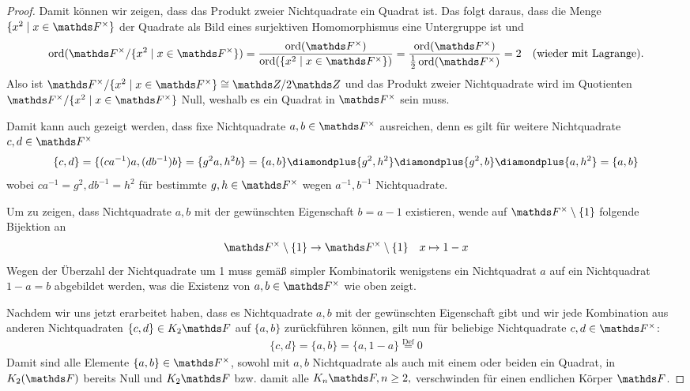 \documentclass[ngerman,fontsize=11pt, paper=a4, parskip=half, titlepage=true, toc=bib]{scrartcl}
\begin{document}
\begin{Lem}
\begin{proof}
    Damit können wir zeigen, dass das Produkt zweier Nichtquadrate ein
    Quadrat ist. Das folgt daraus, dass  die Menge 
    $\{x^2\mid x\in\Fx\}$ der Quadrate 
    als Bild eines surjektiven Homomorphismus eine Untergruppe ist und 
    \begin{gather*}
      \Ord(\Fx/\{x^2\mid x\in\Fx\})
      =\frac{\Ord(\Fx)}{\Ord(\{x^2\mid x\in\Fx\})}
      =\frac{\Ord(\Fx)}{\frac{1}{2}\Ord(\Fx)}=2
      \quad\text{(wieder mit Lagrange).}
    \end{gather*} 
    Also ist $\Fx/\{x^2\mid x\in\Fx\}\cong \Z/2\Z$ und das Produkt 
    zweier Nichtquadrate wird im Quotienten
    $\Fx/\{x^2\mid x\in\Fx\}$ Null, weshalb es ein Quadrat in $\Fx$
    sein muss.

    Damit kann auch gezeigt werden, dass fixe Nichtquadrate $a,b\in\Fx$
    ausreichen, denn es gilt für weitere Nichtquadrate $c,d\in\Fx$
    \begin{gather*}
      \{c,d\}=\{(ca^{-1})a,(db^{-1})b\}=\{g^2a,h^2b\}
      =\{a,b\}\p\{g^2,h^2\}\p\{g^2,b\}\p\{a,h^2\}
      =\{a,b\}
    \end{gather*}
    wobei $ca^{-1}=g^2,db^{-1}=h^2$ für bestimmte $g,h\in\Fx$
    wegen $a^{-1},b^{-1}$ Nichtquadrate.

    Um zu zeigen, dass Nichtquadrate $a,b$ mit der gewünschten
    Eigenschaft $b=a-1$ existieren, wende auf $\Fx\setminus\{1\}$ 
    folgende Bijektion an
    \begin{align*}
      \Fx\setminus\{1\}&\to \Fx\setminus\{1\}
      &x\mapsto 1-x
    \end{align*}
    Wegen der Überzahl der Nichtquadrate um 1 muss gemäß simpler
    Kombinatorik wenigstens ein Nichtquadrat $a$  auf ein Nichtquadrat
    $1-a=b$ abgebildet werden, was die Existenz
    von $a,b\in\Fx$ wie oben zeigt.

    Nachdem wir uns jetzt erarbeitet haben, dass es Nichtquadrate
    $a,b$ mit der gewünschten Eigenschaft gibt und wir jede
    Kombination aus anderen Nichtquadraten $\{c,d\}\in\K_2\F$ 
    auf $\{a,b\}$ zurückführen können,
    gilt nun für beliebige Nichtquadrate $c,d\in\Fx$:
    \begin{gather*}
      \{c,d\}=\{a,b\}=\{a,1-a\} \overset{\text{Def}}{=} 0
    \end{gather*}
    Damit sind alle Elemente $\{a,b\}\in\Fx$, sowohl mit $a,b$
    Nichtquadrate als auch mit einem oder beiden ein Quadrat, 
    in $\K_2(\F)$ bereits Null und $\K_2\F$
    bzw. damit alle $\K_n\F,n\geq 2,$ verschwinden für einen endlichen
    Körper $\F$.
  \end{proof}
\end{Lem}
\end{document}
